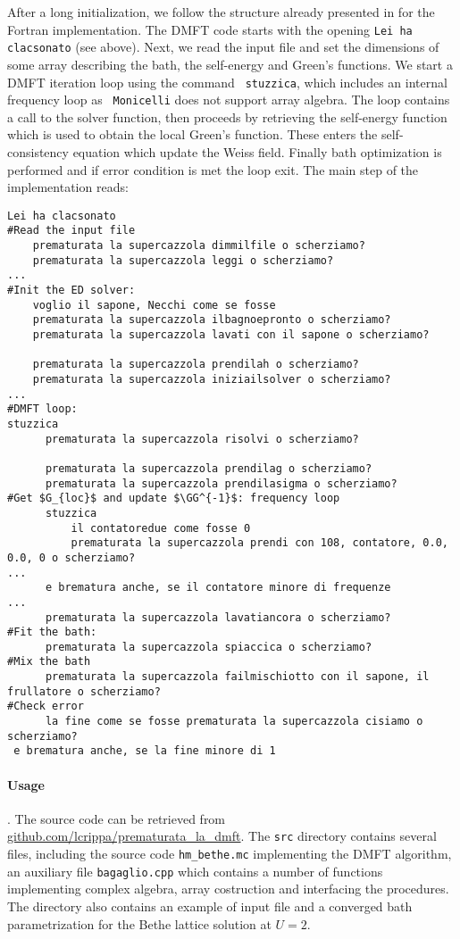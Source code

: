 \documentclass[edipack2.tex]{subfiles}
\begin{document}
After a long initialization, we follow the structure already presented
in  for the Fortran implementation.
The DMFT code starts with the opening {\tt Lei ha clacsonato} (see
above). Next, we read the input file and set the dimensions of some
array describing the bath, the self-energy and Green's
functions. We start a DMFT iteration loop using the command {\tt
  stuzzica}, which includes an internal frequency loop as {\tt
  Monicelli} does not support array algebra.
The loop contains a call to the \NAME solver function, then proceeds
by retrieving the self-energy function which is used to obtain the
local Green's function. These enters the self-consistency equation
which update the Weiss field. Finally bath optimization is performed
and if error condition is met the loop exit.
The main step of the implementation reads: 


\begin{lstlisting}[style=cstyle]
Lei ha clacsonato
#Read the input file
    prematurata la supercazzola dimmilfile o scherziamo?
    prematurata la supercazzola leggi o scherziamo? 
...                                                  
#Init the ED solver:
    voglio il sapone, Necchi come se fosse
    prematurata la supercazzola ilbagnoepronto o scherziamo?
    prematurata la supercazzola lavati con il sapone o scherziamo?
        
    prematurata la supercazzola prendilah o scherziamo?
    prematurata la supercazzola iniziailsolver o scherziamo?
...
#DMFT loop:
stuzzica    
      prematurata la supercazzola risolvi o scherziamo?
      
      prematurata la supercazzola prendilag o scherziamo?
      prematurata la supercazzola prendilasigma o scherziamo?
#Get $G_{loc}$ and update $\GG^{-1}$: frequency loop
      stuzzica                   
          il contatoredue come fosse 0
          prematurata la supercazzola prendi con 108, contatore, 0.0, 0.0, 0 o scherziamo?
...
      e brematura anche, se il contatore minore di frequenze
...      
      prematurata la supercazzola lavatiancora o scherziamo?
#Fit the bath:       
      prematurata la supercazzola spiaccica o scherziamo?
#Mix the bath           
      prematurata la supercazzola failmischiotto con il sapone, il frullatore o scherziamo?
#Check error      
      la fine come se fosse prematurata la supercazzola cisiamo o scherziamo?         
 e brematura anche, se la fine minore di 1
\end{lstlisting}

\paragraph{Usage}.
The source code can be retrieved from
\href{https://github.com/lcrippa/prematurata_la_dmft}{github.com/lcrippa/prematurata\_la\_dmft}. 
The {\tt src} directory contains several files, including the source
code {\tt hm\_bethe.mc} implementing the DMFT algorithm, an auxiliary file {\tt bagaglio.cpp} which
contains a number of functions implementing complex algebra, array
costruction and interfacing the \NAME procedures. The directory also
contains an example of input file and a converged bath parametrization
for the Bethe lattice solution at $U=2$.
\end{document}
